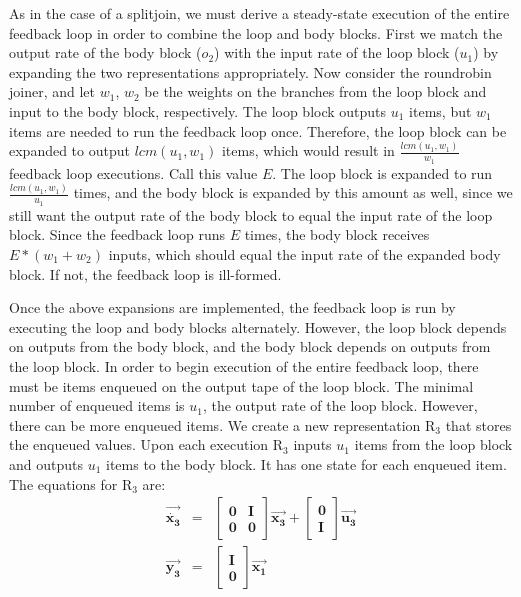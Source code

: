    As in the case of a splitjoin, we must derive a steady-state
execution of the entire feedback loop in order to combine the loop
and body blocks. First we match the output rate of the body block
($o_2$) with the input rate of the loop block ($u_1$) by expanding
the two representations appropriately. Now consider the roundrobin
joiner, and let $w_1$, $w_2$ be the weights on the branches from
the loop block and input to the body block, respectively. The loop
block outputs $u_1$ items, but $w_1$ items are needed to run the
feedback loop once. Therefore, the loop block can be expanded to
output $lcm(u_1,w_1)$ items, which would result in
$\frac{lcm(u_1,w_1)}{w_1}$ feedback loop executions. Call this
value $E$. The loop block is expanded to run
$\frac{lcm(u_1,w_1)}{u_1}$ times, and the body block is expanded
by this amount as well, since we still want the output rate of the
body block to equal the input rate of the loop block. Since the
feedback loop runs $E$ times, the body block receives $E*(w_1 +
w_2)$ inputs, which should equal the input rate of the expanded
body block. If not, the feedback loop is ill-formed.

    Once the above expansions are implemented, the feedback loop
is run by executing the loop and body blocks alternately. However,
the loop block depends on outputs from the body block, and the
body block depends on outputs from the loop block. In order to
begin execution of the entire feedback loop, there must be items
enqueued on the output tape of the loop block. The minimal number
of enqueued items is $u_1$, the output rate of the loop block.
However, there can be more enqueued items. We create a new
representation $\mathrm{R_3}$ that stores the enqueued values.
Upon each execution $\mathrm{R_3}$ inputs $u_1$ items from the
loop block and outputs $u_1$ items to the body block. It has one
state for each enqueued item. The equations for $\mathrm{R_3}$
are:
\begin{eqnarray*}
\vec{\dot{\mathbf{x_3}}} & = & \left [ \begin{array} {cc}
\mathbf{0} & \mathbf{I} \\ \mathbf{0} & \mathbf{0} \end{array} \right ]
\vec{\mathbf{x_3}} + \left [ \begin{array} {c} \mathbf{0} \\ \mathbf{I}
\end{array} \right ] \vec{\mathbf{u_3}} \\
\vec{\mathbf{y_3}} & = & \left [ \begin{array} {c} \mathbf{I} \\
\mathbf{0} \end{array} \right ] \vec{\mathbf{x_1}}
\end{eqnarray*}

